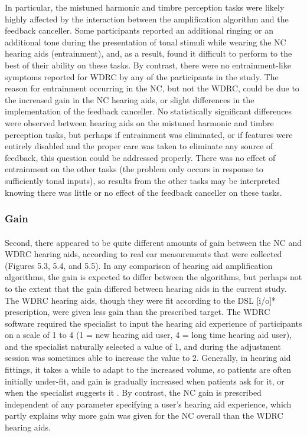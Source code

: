 In particular, the mistuned harmonic and timbre perception tasks were likely highly affected by the interaction between the amplification algorithm and the feedback canceller.  Some participants reported an additional ringing or an additional tone during the presentation of tonal stimuli while wearing the NC hearing aids (entrainment), and, as a result, found it difficult to perform to the best of their ability on these tasks.  By contrast, there were no entrainment-like symptoms reported for WDRC by any of the participants in the study.  The reason for entrainment occurring in the NC, but not the WDRC, could be due to the increased gain in the NC hearing aids, or slight differences in the implementation of the feedback canceller.  No statistically significant differences were observed between hearing aids on the mistuned harmonic and timbre perception tasks, but perhaps if entrainment was eliminated, or if features were entirely disabled and the proper care was taken to eliminate any source of feedback, this question could be addressed properly.  There was no effect of entrainment on the other tasks (the problem only occurs in response to sufficiently tonal inputs), so results from the other tasks may be interpreted knowing there was little or no effect of the feedback canceller on these tasks.

\subsubsection{Gain}
\paragraph{}Second, there appeared to be quite different amounts of gain between the NC and WDRC hearing aids, according to real ear measurements that were collected (Figures 5.3, 5.4, and 5.5).  In any comparison of hearing aid amplification algorithms, the gain is expected to differ between the algorithms, but perhaps not to the extent that the gain differed between hearing aids in the current study.  The WDRC hearing aids, though they were fit according to the DSL [i/o]* prescription, were given less gain than the prescribed target.  The WDRC software required the specialist to input the hearing aid experience of participants on a scale of 1 to 4 (1 = new hearing aid user, 4 = long time hearing aid user), and the specialist naturally selected a value of 1, and during the adjustment session was sometimes able to increase the value to 2.  Generally, in hearing aid fittings, it takes a while to adapt to the increased volume, so patients are often initially under-fit, and gain is gradually increased when patients ask for it, or when the specialist suggests it \cite{Brooks1973}.  By contrast, the NC gain is prescribed independent of any parameter specifying a user's hearing aid experience, which partly explains why more gain was given for the NC overall than the WDRC hearing aids.

